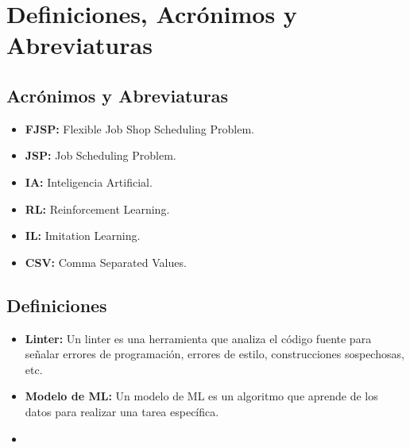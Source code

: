 \section{Definiciones, Acrónimos y Abreviaturas}
\subsection{Acrónimos y Abreviaturas}
\begin{itemize}
    \item \textbf{FJSP: } Flexible Job Shop Scheduling Problem.
    \item \textbf{JSP: } Job Scheduling Problem.
    \item \textbf{IA: } Inteligencia Artificial.
    \item \textbf{RL: } Reinforcement Learning.
    \item \textbf{IL: } Imitation Learning.
    \item \textbf{CSV: } Comma Separated Values.
\end{itemize}

\subsection{Definiciones}
\begin{itemize}
    \item \textbf{Linter: } Un linter es una herramienta que analiza el código fuente 
    para señalar errores de programación, errores de estilo, construcciones sospechosas, etc.
    \item \textbf{Modelo de ML: } Un modelo de ML es un algoritmo que aprende de los datos
    para realizar una tarea específica. 
    \item  
\end{itemize}

\pagebreak